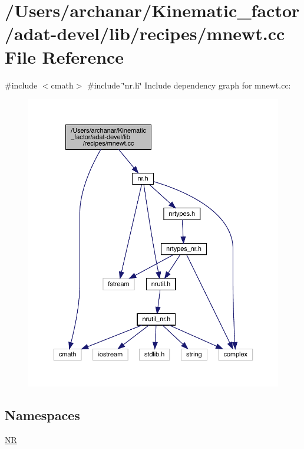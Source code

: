 \hypertarget{adat-devel_2lib_2recipes_2mnewt_8cc}{}\section{/\+Users/archanar/\+Kinematic\+\_\+factor/adat-\/devel/lib/recipes/mnewt.cc File Reference}
\label{adat-devel_2lib_2recipes_2mnewt_8cc}
{\ttfamily \#include $<$cmath$>$}\newline
{\ttfamily \#include \char`\"{}nr.\+h\char`\"{}}\newline
Include dependency graph for mnewt.\+cc\+:
\nopagebreak
\begin{figure}[H]
\begin{center}
\leavevmode
\includegraphics[width=350pt]{dd/d08/adat-devel_2lib_2recipes_2mnewt_8cc__incl}
\end{center}
\end{figure}
\subsection*{Namespaces}
\begin{DoxyCompactItemize}
\item 
 \mbox{\hyperlink{namespaceNR}{NR}}
\end{DoxyCompactItemize}
